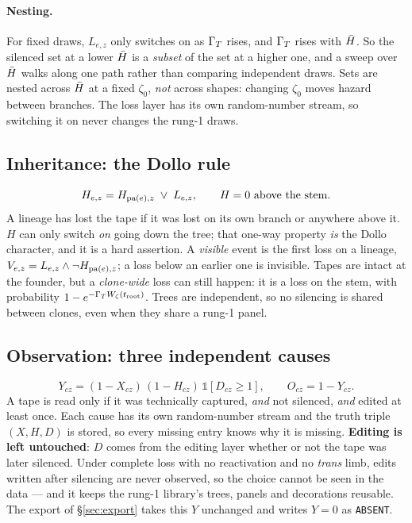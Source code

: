 \paragraph{Nesting.} For fixed draws, $L_{e,z}$ only switches on as $\Gamma_T$ rises, and $\Gamma_T$ rises with
$\bar H$. So the silenced set at a lower $\bar H$ is a \emph{subset} of the set at a higher one, and a
sweep over $\bar H$ walks along one path rather than comparing independent draws. Sets are nested
across $\bar H$ at a fixed $\zeta_0$, \emph{not} across shapes: changing $\zeta_0$ moves hazard between
branches. The loss layer has its own random-number stream, so switching it on never changes the rung-1
draws.

\subsection{Inheritance: the Dollo rule}\label{sec:dollo}

\begin{equation}
  H_{e,z}=H_{{\rm pa}(e),z}\;\vee\;L_{e,z},\qquad H=0\ \text{above the stem.}
  \label{eq:dollo}
\end{equation}
A lineage has lost the tape if it was lost on its own branch or anywhere above it. $H$ can only switch
\emph{on} going down the tree; that one-way property \emph{is} the Dollo character, and it is a hard
assertion. A \emph{visible} event is the first loss on a lineage,
$V_{e,z}=L_{e,z}\wedge\neg H_{{\rm pa}(e),z}$; a loss below an earlier one is invisible. Tapes are intact
at the founder, but a \emph{clone-wide} loss can still happen: it is a loss on the stem, with probability
$1-e^{-\Gamma_T W_\zeta(t_{\rm root})}$. Trees are independent, so no silencing is shared between clones,
even when they share a rung-1 panel.

\subsection{Observation: three independent causes}\label{sec:observe2}

\begin{equation}
  Y_{cz}=(1-X_{cz})\,(1-H_{cz})\,\mathbb 1[D_{cz}\ge1],\qquad O_{cz}=1-Y_{cz}.
  \label{eq:observe2}
\end{equation}
A tape is read only if it was technically captured, \emph{and} not silenced, \emph{and} edited at least
once. Each cause has its own random-number stream and the truth triple $(X,H,D)$ is stored, so every
missing entry knows why it is missing. \textbf{Editing is left untouched}: $D$ comes from the editing
layer whether or not the tape was later silenced. Under complete loss with no reactivation and no
\emph{trans} limb, edits written after silencing are never observed, so the choice cannot be seen in the
data --- and it keeps the rung-1 library's trees, panels and decorations reusable. The export of
\S\ref{sec:export} takes this $Y$ unchanged and writes $Y=0$ as \texttt{ABSENT}.

